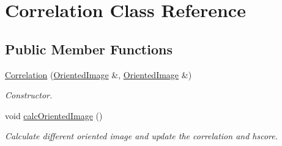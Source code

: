 \hypertarget{classCorrelation}{\section{\-Correlation \-Class \-Reference}
\label{classCorrelation}
}
\subsection*{\-Public \-Member \-Functions}
\begin{DoxyCompactItemize}
\item 
\hypertarget{classCorrelation_ab5985ae6e12ec535ba5140b266f3a193}{\hyperlink{classCorrelation_ab5985ae6e12ec535ba5140b266f3a193}{\-Correlation} (\hyperlink{classOrientedImage}{\-Oriented\-Image} \&, \hyperlink{classOrientedImage}{\-Oriented\-Image} \&)}\label{classCorrelation_ab5985ae6e12ec535ba5140b266f3a193}

\begin{DoxyCompactList}\small\item\em \-Constructor. \end{DoxyCompactList}\item 
\hypertarget{classCorrelation_a75340986ddb889cd1b5f495c7033c55f}{void \hyperlink{classCorrelation_a75340986ddb889cd1b5f495c7033c55f}{calc\-Oriented\-Image} ()}\label{classCorrelation_a75340986ddb889cd1b5f495c7033c55f}

\begin{DoxyCompactList}\small\item\em \-Calculate different oriented image and update the correlation and hscore. \end{DoxyCompactList}\end{DoxyCompactItemize}
